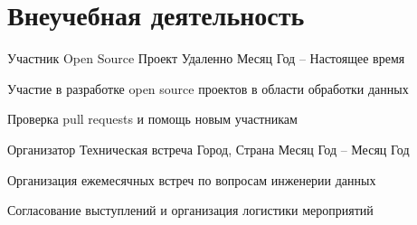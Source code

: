 \section{Внеучебная деятельность}

\begin{cventries}
  \cventry
    {Участник Open Source} %
    {Проект} %
    {Удаленно} %
    {Месяц Год -- Настоящее время} %
    {
      \begin{cvitems}
        \item {Участие в разработке open source проектов в области обработки данных}
        \item {Проверка pull requests и помощь новым участникам}
      \end{cvitems}
    }

  \cventry
    {Организатор} %
    {Техническая встреча} %
    {Город, Страна} %
    {Месяц Год -- Месяц Год} %
    {
      \begin{cvitems}
        \item {Организация ежемесячных встреч по вопросам инженерии данных}
        \item {Согласование выступлений и организация логистики мероприятий}
      \end{cvitems}
    }
\end{cventries}